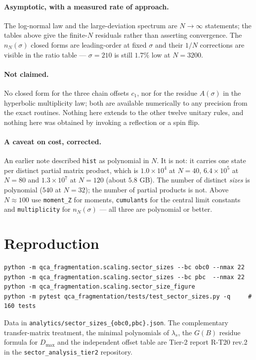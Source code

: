 \documentclass[11pt]{article}
\newcommand{\fn}[1]{\texttt{#1}}
\theoremstyle{plain}
\theoremstyle{remark}
\begin{document}
\paragraph{Asymptotic, with a measured rate of approach.} The log-normal law and
the large-deviation spectrum are $N\to\infty$ statements; the tables above give
the finite-$N$ residuals rather than asserting convergence. The
$n_N(\sigma)$ closed forms are leading-order at fixed $\sigma$ and their
$1/N$ corrections are visible in the ratio table --- $\sigma=210$ is still
$1.7\%$ low at $N=3200$.

\paragraph{Not claimed.} No closed form for the three chain offsets $c_1$, nor
for the residue $A(\sigma)$ in the hyperbolic multiplicity law; both are
available numerically to any precision from the exact routines. Nothing here
extends to the other twelve unitary rules, and nothing here was obtained by
invoking a reflection or a spin flip.

\paragraph{A caveat on cost, corrected.} An earlier note described
\fn{hist} as polynomial in $N$. It is not: it carries one state per distinct
partial matrix product, which is $1.0\times10^4$ at $N=40$, $6.4\times10^5$ at
$N=80$ and $1.3\times10^7$ at $N=120$ (about $5.8$ GB). The number of distinct
\emph{sizes} is polynomial ($540$ at $N=32$); the number of partial products is
not. Above $N\approx100$ use \fn{moment\_Z} for moments, \fn{cumulants} for the
central limit constants and \fn{multiplicity} for $n_N(\sigma)$ --- all three are
polynomial or better.

\section{Reproduction}

\begin{verbatim}
python -m qca_fragmentation.scaling.sector_sizes --bc obc0 --nmax 22
python -m qca_fragmentation.scaling.sector_sizes --bc pbc  --nmax 22
python -m qca_fragmentation.scaling.sector_size_figure
python -m pytest qca_fragmentation/tests/test_sector_sizes.py -q     # 160 tests
\end{verbatim}

\noindent Data in \fn{analytics/sector\_sizes\_\{obc0,pbc\}.json}. The
complementary transfer-matrix treatment, the minimal polynomials of $\lambda_s$,
the $G(B)$ residue formula for $D_{\max}$ and the independent offset table are
Tier-2 report R-T20 rev.2 in the \fn{sector\_analysis\_tier2} repository.
\end{document}
